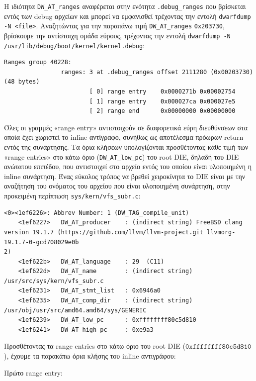 \documentclass[12pt]{article}
\begin{document}
Η ιδιότητα \lstinline{DW_AT_ranges} αναφέρεται στην ενότητα
\lstinline{.debug_ranges} που βρίσκεται εντός των debug αρχείων και μπορεί να
εμφανισθεί τρέχοντας την εντολή \lstinline{dwarfdump -N <file>}. Αναζητώντας
για την παραπάνω τιμή \lstinline{DW_AT_ranges} \lstinline{0x203730}, βρίσκουμε
την αντίστοιχη ομάδα εύρους, τρέχοντας την εντολή
\lstinline{dwarfdump -N /usr/lib/debug/boot/kernel/kernel.debug}:

\begin{lstlisting}[caption={Παράδειγμα \lstinline{DW_AT_ranges}}, captionpos=b]
 Ranges group 40228:
                ranges: 3 at .debug_ranges offset 2111280 (0x00203730) (48 bytes)
                        [ 0] range entry    0x0000271b 0x00002754
                        [ 1] range entry    0x000027ca 0x000027e5
                        [ 2] range end      0x00000000 0x00000000
\end{lstlisting}

Όλες οι γραμμές «range entry» αντιστοιχούν σε διαφορετικά εύρη διευθύνσεων στα
οποία έχει χωριστεί το inline αντίγραφο, συνήθως ως αποτέλεσμα πρόωρων return
εντός της συνάρτησης. Τα όρια κλήσεων υπολογίζονται προσθέτοντας κάθε τιμή των
«range entries» στο κάτω όριο (\lstinline{DW_AT_low_pc}) του root DIE, δηλαδή
του DIE ανώτατου επιπέδου, που αντιστοιχεί στο αρχείο εντός του οποίου είναι
υλοποιημένη η inline συνάρτηση. Ένας εύκολος τρόπος να βρεθεί χειροκίνητα το
DIE είναι με την αναζήτηση του ονόματος του αρχείου που είναι υλοποιημένη
συνάρτηση, στην προκειμένη περίπτωση \lstinline{sys/kern/vfs_subr.c}:

\begin{lstlisting}[caption={DIE μονάδας μεταγλώττισης}, captionpos=b]
 <0><1ef6226>: Abbrev Number: 1 (DW_TAG_compile_unit)
    <1ef6227>   DW_AT_producer    : (indirect string) FreeBSD clang version 19.1.7 (https://github.com/llvm/llvm-project.git llvmorg-19.1.7-0-gcd708029e0b
2)
    <1ef622b>   DW_AT_language    : 29  (C11)
    <1ef622d>   DW_AT_name        : (indirect string) /usr/src/sys/kern/vfs_subr.c
    <1ef6231>   DW_AT_stmt_list   : 0x6946a0
    <1ef6235>   DW_AT_comp_dir    : (indirect string) /usr/obj/usr/src/amd64.amd64/sys/GENERIC
    <1ef6239>   DW_AT_low_pc      : 0xffffffff80c5d810
    <1ef6241>   DW_AT_high_pc     : 0xe9a3
\end{lstlisting}

Προσθέτοντας τα range entries στο κάτω όριο του root DIE
($\mathtt{0xffffffff80c5d810}$), έχουμε τα παρακάτω όρια κλήσης του inline
αντιγράφου:

Πρώτο range entry:
\end{document}
